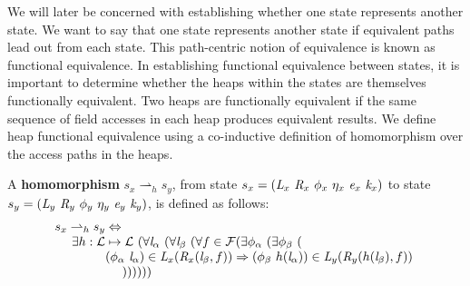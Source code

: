 We will later be concerned with establishing whether one state represents another state. We want to say that one state represents another state if equivalent paths lead out from each state. This path-centric notion of equivalence is known as functional equivalence. In establishing functional equivalence between states, it is important to determine whether the heaps within the states are themselves functionally equivalent. Two heaps are functionally equivalent if the same sequence of field accesses in each heap produces equivalent results. We define heap functional equivalence using a co-inductive definition of homomorphism over the access paths in the heaps.

\begin{definition}
\label{def:homomorphism}
A \textbf{homomorphism} $s_x \rightharpoonup_{h} s_y$, from state $s_x = ( \cfgnt{L}_x\ \cfgnt{R}_x\ \phi_x\ \eta_x\ \cfgnt{e}_x\ \cfgnt{k}_x )$ to state $s_y = ( \cfgnt{L}_y\ \cfgnt{R}_y\ \phi_y\ \eta_y\ \cfgnt{e}_y\ \cfgnt{k}_y )$, is defined as follows: 
$$
\begin{array}{l}
 s_x \rightharpoonup_{h} s_y \Leftrightarrow \\
\ \ \ \ \exists h: \mathcal{L} \mapsto \mathcal{L}\ (\forall \cfgnt{l}_\alpha\ (\forall \cfgnt{l}_\beta\ (\forall f \in \mathcal{F}( \exists \phi_\alpha\ (\exists \phi_\beta\ ( \\ 
\ \ \ \ \ \ \ \ \ \ \ \ (\phi_\alpha\ \cfgnt{l}_\alpha) \in \cfgnt{L}_x(\cfgnt{R}_x (\cfgnt{l}_\beta,f )) \Rightarrow (\phi_\beta\ h(\cfgnt{l}_\alpha))\in \cfgnt{L}_y(\cfgnt{R}_y (h(\cfgnt{l}_\beta),f ))\ \\
\ \ \ \ \ \ \ \ \ \ \ \ \ \ \ \  )) ) ) ) )
\end{array}
$$
\begin{comment}
$$
\begin{array}{l}
s_x \rightharpoonup_{h} s_y \Leftrightarrow \\
\ \ \ \ \exists h: \mathcal{L} \mapsto \mathcal{L}\ (\forall \cfgnt{l}_\beta\ (\forall f \in \mathit{fields}(\mathrm{type}(\cfgnt{l}_\beta))\ ( \\
\ \ \ \ \ \ \ \ \ \ \ \ \forall (\phi_\alpha\ \cfgnt{l}_\alpha) \in \cfgnt{L}_x(\cfgnt{R}_x (\cfgnt{l}_\beta,f ))\ ( \\
\ \ \ \ \ \ \ \ \ \ \ \ \ \ \ \ \exists \phi_\beta\ ((\phi_\beta\ h(\cfgnt{l}_\alpha))\in \cfgnt{L}_y(\cfgnt{R}_y (h(\cfgnt{l}_\beta),f )))))))\\
\end{array}
$$
\end{comment}
\end{definition}

